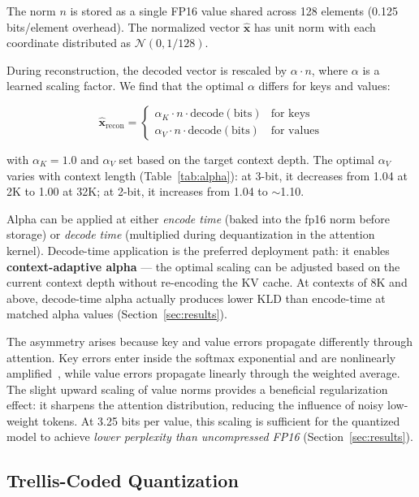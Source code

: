 \documentclass{article}
\begin{document}
The norm $n$ is stored as a single FP16 value shared across 128 elements
(0.125 bits/element overhead). The normalized vector $\hat{\mathbf{x}}$ has
unit norm with each coordinate distributed as $\mathcal{N}(0, 1/128)$.

During reconstruction, the decoded vector is rescaled by $\alpha \cdot n$,
where $\alpha$ is a learned scaling factor. We find that the optimal $\alpha$
differs for keys and values:

\begin{equation}
\hat{\mathbf{x}}_{\text{recon}} =
\begin{cases}
\alpha_K \cdot n \cdot \mathrm{decode}(\text{bits}) & \text{for keys} \\
\alpha_V \cdot n \cdot \mathrm{decode}(\text{bits}) & \text{for values}
\end{cases}
\end{equation}

with $\alpha_K = 1.0$ and $\alpha_V$ set based on the target context depth.
The optimal $\alpha_V$ varies with context length
(Table~\ref{tab:alpha}): at 3-bit, it decreases from 1.04 at 2K to 1.00
at 32K; at 2-bit, it increases from 1.04 to $\sim$1.10.

Alpha can be applied at either \emph{encode time} (baked into the fp16 norm
before storage) or \emph{decode time} (multiplied during dequantization in
the attention kernel). Decode-time application is the preferred deployment
path: it enables \textbf{context-adaptive alpha} --- the optimal scaling can
be adjusted based on the current context depth without re-encoding the KV
cache. At contexts of 8K and above, decode-time alpha actually produces
lower KLD than encode-time at matched alpha values (Section~\ref{sec:results}).

The asymmetry arises because key and value errors propagate differently through
attention. Key errors enter inside the softmax exponential and are nonlinearly
amplified~\cite{asymkv2024}, while value errors propagate linearly through the
weighted average. The slight upward scaling of value norms provides a beneficial
regularization effect: it sharpens the attention distribution, reducing the
influence of noisy low-weight tokens. At 3.25 bits per value, this scaling is
sufficient for the quantized model to achieve \emph{lower perplexity than
uncompressed FP16} (Section~\ref{sec:results}).

\subsection{Trellis-Coded Quantization}
\label{sec:tcq}
\end{document}
